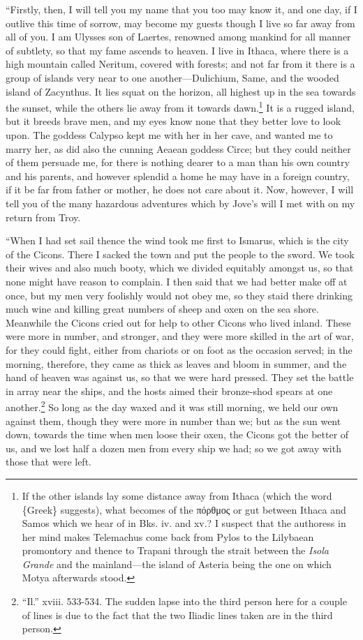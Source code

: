 “Firstly, then, I will tell you my name that you too may know it, and one day,
if I outlive this time of sorrow, may become my guests though I live so far
away from all of you. I am Ulysses son of Laertes, renowned among mankind for
all manner of subtlety, so that my fame ascends to heaven. I live in Ithaca,
where there is a high mountain called Neritum, covered with forests; and not
far from it there is a group of islands very near to one another—Dulichium,
Same, and the wooded island of Zacynthus. It lies squat on the horizon, all
highest up in the sea towards the sunset, while the others lie away from it
towards dawn.\footnote{If the other islands lay some distance away from Ithaca (which the word
\{Greek\} suggests), what becomes of the
πόρθμος or gut between Ithaca and Samos
which we hear of in Bks. iv. and xv.? I suspect that the authoress in her mind
makes Telemachus come back from Pylos to the Lilybaean promontory and thence
to Trapani through the strait between the \emph{Isola Grande} and the
mainland—the island of Asteria being the one on which Motya afterwards stood.}
It is a rugged island, but it breeds brave men, and my eyes know none that they
better love to look upon. The goddess Calypso kept me with her in her cave, and
wanted me to marry her, as did also the cunning Aeaean goddess Circe; but they
could neither of them persuade me, for there is nothing dearer to a man than
his own country and his parents, and however splendid a home he may have in a
foreign country, if it be far from father or mother, he does not care about it.
Now, however, I will tell you of the many hazardous adventures which by Jove’s
will I met with on my return from Troy.

“When I had set sail thence the wind took me first to Ismarus, which is the
city of the Cicons. There I sacked the town and put the people to the sword. We
took their wives and also much booty, which we divided equitably amongst us, so
that none might have reason to complain. I then said that we had better make
off at once, but my men very foolishly would not obey me, so they staid there
drinking much wine and killing great numbers of sheep and oxen on the sea
shore. Meanwhile the Cicons cried out for help to other Cicons who lived
inland. These were more in number, and stronger, and they were more skilled in
the art of war, for they could fight, either from chariots or on foot as the
occasion served; in the morning, therefore, they came as thick as leaves and
bloom in summer, and the hand of heaven was against us, so that we were hard
pressed. They set the battle in array near the ships, and the hosts aimed their
bronze-shod spears at one another.\footnote{“Il.” xviii. 533-534. The sudden lapse into the third person here for a
couple of lines is due to the fact that the two Iliadic lines taken are in the
third person.} So long as the day waxed and it was
still morning, we held our own against them, though they were more in number
than we; but as the sun went down, towards the time when men loose their oxen,
the Cicons got the better of us, and we lost half a dozen men from every ship
we had; so we got away with those that were left.

